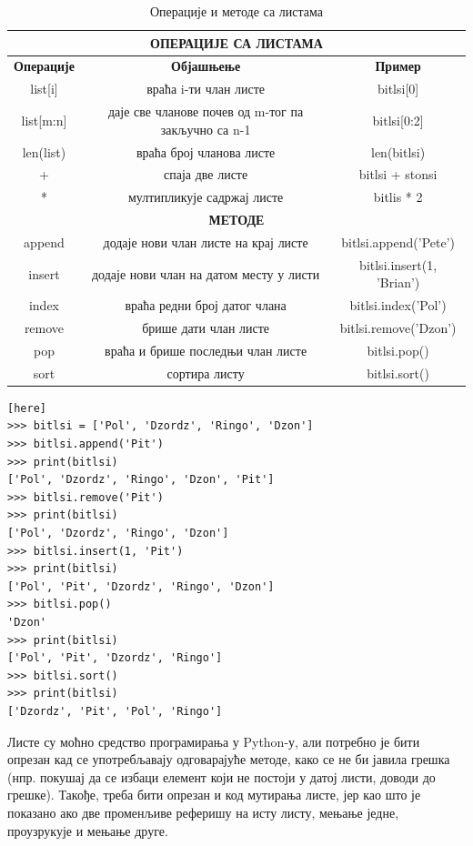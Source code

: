 \begin{table}[here]
\centering
\begin{tabular}{|c|c|c|}\hline
\multicolumn{3}{|c|}{\textbf{ОПЕРАЦИЈЕ СА ЛИСТАМА}}\\ \hline
\textbf{Операције} & \textbf{Објашњење} & \textbf{Пример} \\ \hline
           list[i] & враћа i-ти члан листе & bitlsi[0] \\ \hline
         list[m:n] & даје све чланове почев од m-тог па закључно са n-1 & bitlsi[0:2] \\ \hline
		 len(list) & враћа број чланова листе & len(bitlsi) \\ \hline
		         + & спаја две листе & bitlsi + stonsi \\ \hline
		         * & мултипликује садржај листе & bitlis * 2 \\ \hline
\multicolumn{3}{|c|}{\textbf{МЕТОДЕ}}\\ \hline
    		append & додаје нови члан листе на крај листе & bitlsi.append('Pete')\\ \hline
	    	insert & додаје нови члан на датом месту у листи & bitlsi.insert(1, 'Brian') \\ \hline
		     index & враћа редни број датог члана & bitlsi.index('Pol') \\ \hline
		    remove & брише дати члан листе & bitlsi.remove('Dzon') \\ \hline
		       pop & враћа и брише последњи члан листе & bitlsi.pop() \\ \hline
		      sort & сортира листу & bitlsi.sort() \\ \hline
\end{tabular}
\caption{Операције и методе са листама}
\label{tabela:liste}
\end{table}

\begin{lstlisting}[caption= Мењање листе, label = mutacija_list][here]
>>> bitlsi = ['Pol', 'Dzordz', 'Ringo', 'Dzon']
>>> bitlsi.append('Pit')
>>> print(bitlsi)
['Pol', 'Dzordz', 'Ringo', 'Dzon', 'Pit']
>>> bitlsi.remove('Pit')
>>> print(bitlsi)
['Pol', 'Dzordz', 'Ringo', 'Dzon']
>>> bitlsi.insert(1, 'Pit')
>>> print(bitlsi)
['Pol', 'Pit', 'Dzordz', 'Ringo', 'Dzon']
>>> bitlsi.pop()
'Dzon'
>>> print(bitlsi)
['Pol', 'Pit', 'Dzordz', 'Ringo']
>>> bitlsi.sort()
>>> print(bitlsi)
['Dzordz', 'Pit', 'Pol', 'Ringo']
\end{lstlisting}

Листе су моћно средство програмирања у Python-у, али потребно је бити опрезан кад се употребљавају одговарајуће методе, како се не би јавила грешка (нпр. покушај да се избаци елемент који не постоји у датој листи, доводи до грешке). Такође, треба бити опрезан и код мутирања листе, јер као што је показано ако две променљиве реферишу на исту листу, мењање једне, проузрукује и мењање друге.

